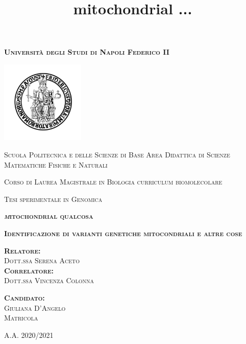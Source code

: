 \documentclass[
11pt, %
oneside, %
english, %
singlespacing, %
headsepline, %
]{MastersDoctoralThesisV2} %
\title{ mitochondrial ... 
\newline }
\author{ }
\date{}
\begin{document}
\begin{titlepage}
\centering
{\scshape\large\normalfont\bfseries Università degli Studi di Napoli Federico II \par}
 \vspace{0.7cm} 
 \includegraphics[width=0.30\textwidth]{Fig/logo.png}
 \par
 \vspace{0.5cm}
\hspace{2cm}
{\scshape\large\normalfont Scuola Politecnica e delle Scienze di Base
\newline
Area Didattica di Scienze Matematiche Fisiche e Naturali
 \par}
 \vspace{0.5cm}
{\scshape\large\normalfont Corso di Laurea Magistrale in Biologia curriculum biomolecolare
 \par}
 \vspace{0.5cm} 
{\scshape\large\normalfont Tesi sperimentale in Genomica
 \par}
  \vspace{0.8cm}
{\scshape\large\normalfont\bfseries\textit mitochondrial qualcosa
 \par}
  \vspace{0.8cm}
{\scshape\large\normalfont\bfseries  Identificazione di varianti genetiche mitocondriali e altre cose 
 \par} 
\vspace{2cm} 
\begin{minipage}{0.45\textwidth}
{\scshape\normalfont\large\bfseries Relatore:}\\
{\scshape\normalfont\large Dott.ssa Serena Aceto} \\ 
{\scshape\normalfont\large\bfseries Correlatore:} \\
{\scshape\normalfont\large Dott.ssa Vincenza Colonna}\\
\end{minipage}
\hspace{2.5cm}
\begin{minipage}{0.25\textwidth}
{\scshape\normalfont\large\bfseries Candidato:}\\
 {\scshape\normalfont\large Giuliana D'Angelo \\
 Matricola } 
\end{minipage}

\vfill
\centering
\vspace{0.48cm} 
{\scshape\Large\normalfont A.A. 2020/2021}

\end{titlepage}
\end{document}

